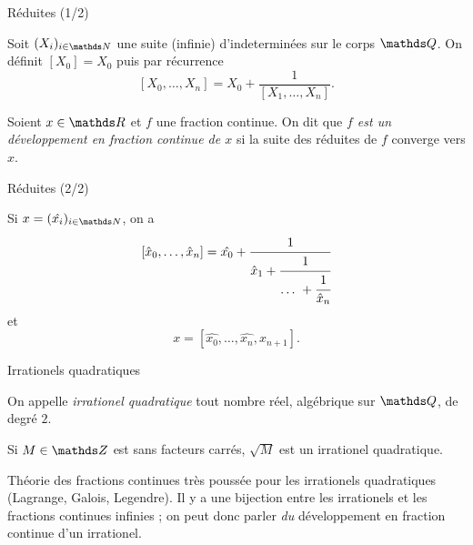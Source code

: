 \begin{frame}{Réduites (1/2)}

\begin{definition}
	Soit $(X_i)_{i\in \N}$ une suite (infinie) d'indeterminées sur le corps
	$\Q$. On définit $[X_0] = X_0$ puis par récurrence \[[X_0, \dots,
	X_n] = X_0 + \frac{1}{[X_1, \dots, X_n]}.\]
\end{definition}

\pause

\begin{definition}
Soient $x\in \R$ et $f$ une fraction continue. On dit que \emph{$f$ est un
développement en fraction continue de $x$} si la suite des réduites de $f$
converge vers $x$.
\end{definition}

\end{frame}

\begin{frame}{Réduites (2/2)}

Si $x = (\hat{x_i})_{i\in \N}$, on a \[[\hat{x}_0, \dots, \hat{x}_n] =
\hat{x_0} + \cfrac{1}{\hat{x}_1 + \cfrac{1}{\dots + \cfrac{1}{\hat{x}_n}}}\]
et \[x = [\hat{x_0}, \dots, \hat{x_n}, x_{n+1}].\]

\end{frame}

\begin{frame}{Irrationels quadratiques}

\begin{definition}
	On appelle \emph{irrationel quadratique} tout nombre réel, algébrique sur
	$\Q$, de degré $2$.
\end{definition}

Si $M\in \Z$ est sans facteurs carrés, $\sqrt{M}$ est un irrationel
quadratique. \vspace{1em}

\pause

Théorie des fractions continues très poussée pour les irrationels quadratiques
(Lagrange, Galois, Legendre). Il y a une bijection entre les irrationels et les
fractions continues infinies ; on peut donc parler \textit{du} développement en
fraction continue d'un irrationel.

\end{frame}

